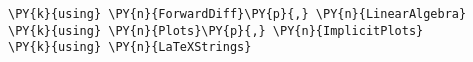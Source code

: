     \begin{tcolorbox}[breakable, size=fbox, boxrule=1pt, pad at break*=1mm,colback=cellbackground, colframe=cellborder]
\begin{Verbatim}[commandchars=\\\{\}]
\PY{k}{using} \PY{n}{ForwardDiff}\PY{p}{,} \PY{n}{LinearAlgebra}
\PY{k}{using} \PY{n}{Plots}\PY{p}{,} \PY{n}{ImplicitPlots}
\PY{k}{using} \PY{n}{LaTeXStrings}
\end{Verbatim}
\end{tcolorbox}